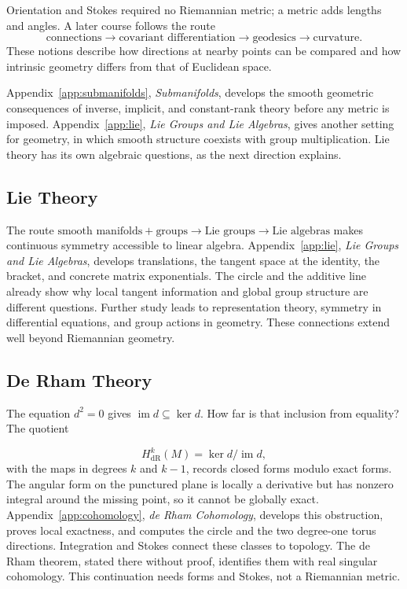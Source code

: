 Orientation and Stokes required no Riemannian metric; a metric adds lengths
and angles. A later course follows the route
\[
\text{connections}\longrightarrow\text{covariant differentiation}
\longrightarrow\text{geodesics}\longrightarrow\text{curvature}.
\]
These notions describe how directions at nearby points can be compared and
how intrinsic geometry differs from that of Euclidean space.


Appendix~\ref{app:submanifolds}, \emph{Submanifolds}, develops the smooth
geometric consequences of inverse, implicit, and constant-rank theory
before any metric is imposed. Appendix~\ref{app:lie}, \emph{Lie Groups
and Lie Algebras}, gives another setting for geometry, in which smooth
structure coexists with group multiplication. Lie theory has its own
algebraic questions, as the next direction explains.

\subsection*{Lie Theory}

\label{sec:lie-theory-preview}
The route $\text{smooth manifolds}+\text{groups}\to\text{Lie groups}
\to\text{Lie algebras}$ makes continuous symmetry accessible to linear
algebra. Appendix~\ref{app:lie}, \emph{Lie Groups and Lie Algebras},
develops translations, the tangent space at the identity, the bracket,
and concrete matrix exponentials. The circle and the additive line already
show why local tangent information and global group structure are different
questions. Further study leads to representation theory, symmetry in
differential equations, and group actions in geometry. These connections
extend well beyond Riemannian geometry.

\subsection*{De Rham Theory}

\label{sec:de-rham-preview}
The equation $d^2=0$ gives $\operatorname{im}d\subseteq\ker d$.
How far is that inclusion from equality? The quotient

\[
H^k_{\mathrm{dR}}(M)=\ker d/\operatorname{im}d,
\]
 with the maps in
degrees $k$ and $k-1$, records closed forms modulo exact forms.
The angular form on the punctured plane is locally a derivative but has
nonzero integral around the missing point, so it cannot be globally exact.
Appendix~\ref{app:cohomology}, \emph{de Rham Cohomology}, develops this
obstruction, proves local exactness, and computes the circle and the two
degree-one torus directions. Integration and Stokes connect these classes
to topology. The de Rham theorem, stated there without proof, identifies
them with real singular cohomology. This continuation needs forms and
Stokes, not a Riemannian metric.


